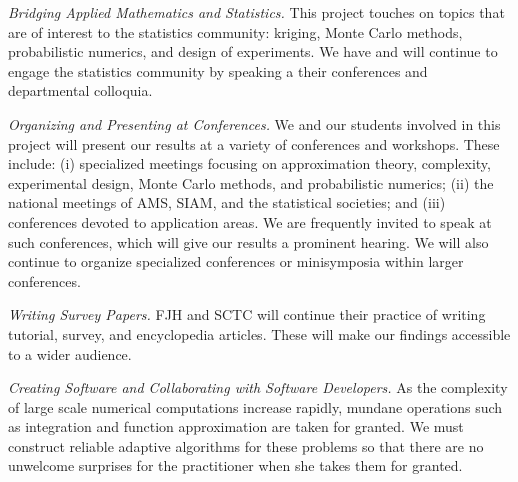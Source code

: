 \documentclass[11pt]{NSFamsart}
\begin{document}
\emph{Bridging Applied Mathematics and Statistics.}
This project touches on topics that are of interest to the statistics community: kriging, Monte Carlo methods, probabilistic numerics, and design of experiments.  We have and will continue to engage the statistics community 
by speaking a their conferences and departmental colloquia.

\emph{Organizing and Presenting at Conferences.}
We and our students involved in this project will present our results at a variety of conferences and workshops.  These include: (i) specialized meetings focusing on approximation theory, complexity, 
experimental design, Monte Carlo methods, and probabilistic numerics; (ii) the national meetings of AMS, SIAM, and the 
statistical societies; and (iii) conferences devoted to application areas.  We are frequently invited to 
speak at such conferences, which will give our results a prominent hearing. We will also continue to 
organize specialized conferences or minisymposia within larger conferences.

\emph{Writing Survey Papers.}
FJH and SCTC will continue their practice of writing tutorial, survey, and encyclopedia articles.  These will make our findings accessible to a wider audience.

\emph{Creating Software and Collaborating with Software Developers.}
As the complexity of large scale numerical computations increase rapidly, mundane operations such as integration and function approximation are taken for granted. We must construct reliable adaptive algorithms for these problems so that there are no unwelcome surprises for the practitioner when she takes them for granted.
\end{document}
